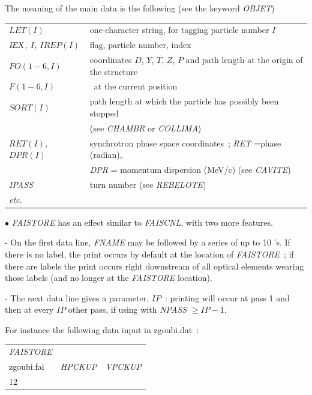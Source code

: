\noindent The meaning of the main data is the following (see the keyword \textsl{OBJET})
\medskip

{\renewcommand{\arraystretch}{1}
 \begin{tabular}{>{\sl}l!{~:}l}
	$LET(I) $  & one-character string, for tagging particle number $I$  \\   
	$\IEX\index{IEX@{\IEX}}$, $I$, $IREP(I)$   &  flag, particle number, index  \\
	 $FO(1-6, I)$  &  coordinates $D$, $Y$, $T$, $Z$, $P$ and path
	                 length at the origin of the structure\\
	 $F(1-6, I)$  &  \id\, at the current position\\
     $SORT(I)$ & path length at which the particle has possibly been stopped\\
             & (see \textsl{CHAMBR} or \textsl{COLLIMA})\\
     $RET(I)$, $DPR(I)$ & synchrotron phase space coordinates~; \textsl{RET} =phase (radian),\\
           &   \textsl{DPR} = momentum dispersion (MeV/c) (see \textsl{CAVITE}) \\
    \textsl{IPASS}  &  turn number (see \textsl{REBELOTE}) \\
 etc.
     \end{tabular}}
\medskip

\noindent $\bullet$  \textsl{FAISTORE} has an effect similar to \textsl{FAISCNL}, with two more features. 

- On the first data line, \textsl{FNAME} may be followed 
by a series of up to 10 \LABEL's.     If there is no 
label, the print occurs by default at the location of \textsl{FAISTORE}~; if there are labels the 
print occurs right downstream of all optical elements wearing those labels
 (and no longer at the \textsl{FAISTORE} location). 

- The next data line 
gives a parameter, $IP$~: printing will occur at pass 1 and then at every $IP$ other pass, if 
using \REBELOTE{} with \textsl{NPASS} $ \geq IP-1$. 

\medskip

\noindent For instance the following data input in zgoubi.dat~: 

\medskip

{\renewcommand{\arraystretch}{1}
\begin{tabular}{lll}
	\textsl{FAISTORE} &  &   \\
	zgoubi.fai \index{zgoubi.fai} & \textsl{HPCKUP} & \textsl{VPCKUP}  \\
	12 &  & 
\end{tabular}}
\medskip

